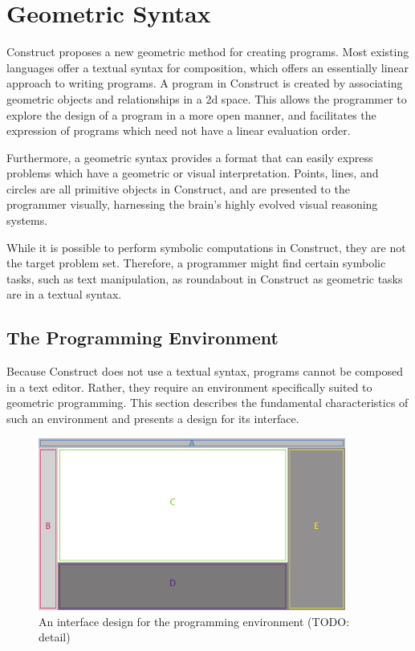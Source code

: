 \documentclass[twoside,11pt]{report}
\begin{document}
\chapter{Geometric Syntax}
\label{chap:syntax}

Construct proposes a new geometric method for creating programs. 
Most existing languages offer a textual syntax for composition, which offers an essentially linear approach to writing programs. 
A program in Construct is created by associating geometric objects and relationships in a 2d space. 
This allows the programmer to explore the design of a program in a more open manner, and facilitates the expression of programs which need not have a linear evaluation order. 

Furthermore, a geometric syntax provides a format that can easily express problems which have a geometric or visual interpretation. 
Points, lines, and circles are all primitive objects in Construct, and are presented to the programmer visually, harnessing the brain's highly evolved visual reasoning systems. 

While it is possible to perform symbolic computations in Construct, they are not the target problem set. 
Therefore, a programmer might find certain symbolic tasks, such as text manipulation, as roundabout in Construct as geometric tasks are in a textual syntax.

\section{The Programming Environment}
\label{sec:environ}

Because Construct does not use a textual syntax, programs cannot be composed in a text editor. 
Rather, they require an environment specifically suited to geometric programming. 
This section describes the fundamental characteristics of such an environment and presents a design for its interface.

\begin{figure}[h]
  \centering
  \includegraphics[width=0.9\textwidth]{interface.pdf}
  \caption{An interface design for the programming environment (TODO: detail)}
  \label{fig:interface}
\end{figure}
\end{document}
